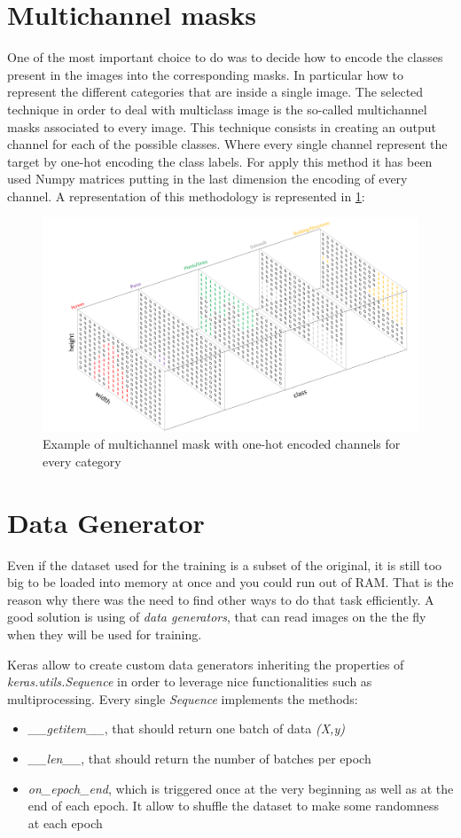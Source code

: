 \documentclass[a4paper,10pt]{report}
\begin{document}
\section{Multichannel masks}\label{sec:section-32}
One of the most important choice to do was to decide how to encode the classes present in the images into the corresponding masks. In particular how to represent the different categories that are inside a single image. The selected technique in order to deal with multiclass image is the so-called multichannel masks associated to every image. This technique consists in creating an output channel for each of the possible classes. Where every single channel represent the target by one-hot encoding the class labels. For apply this method it has been used Numpy matrices putting in the last dimension the encoding of every channel.
A representation of this methodology is represented in \ref{fig:{multimask}}:

\begin{figure}[h]
  \center
  \includegraphics[width=0.7\linewidth]{assets/img/multimask.png}
  \caption{Example of multichannel mask with one-hot encoded channels for every category}
  \label{fig:{multimask}}
\end{figure}


\section{Data Generator}\label{sec:section-33}
Even if the dataset used for the training is a subset of the original, it is still too big to be loaded into memory at once and you could run out of RAM.
That is the reason why there was the need to find other ways to do that task efficiently.
A good solution is using of \textit{data generators}, that can read images on the the fly when they will be used for training.

Keras allow to create custom data generators inheriting the properties of \emph{keras.utils.Sequence} in order to leverage nice functionalities such as multiprocessing.
Every single \emph{Sequence} implements the methods:
\begin{itemize}
    \item \emph{__getitem__}, that should return one batch of data \emph{(X,y)}
    \item \emph{__len__}, that should return the number of batches per epoch
    \item \emph{on_epoch_end}, which is triggered once at the very beginning as well as at the end of each epoch. It allow to shuffle the dataset to make some randomness at each epoch
\end{itemize}
\end{document}
